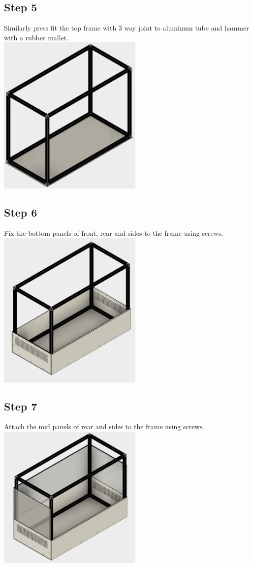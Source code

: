 \documentclass[a4paper,12pt,oneside]{book}
\begin{document}
\subsection*{Step 5}
Similarly press fit the top frame with 3 way joint to aluminum tube and hammer with a rubber mallet.\\
\includegraphics[width=200pt]{5}
\subsection*{Step 6}
Fix the bottom panels of front, rear and sides to the frame using screws.\\
\includegraphics[width=200pt]{6}
\subsection*{Step 7}
Attach the mid panels of rear and sides to the frame using screws.\\
\includegraphics[width=200pt]{7}
\end{document}
